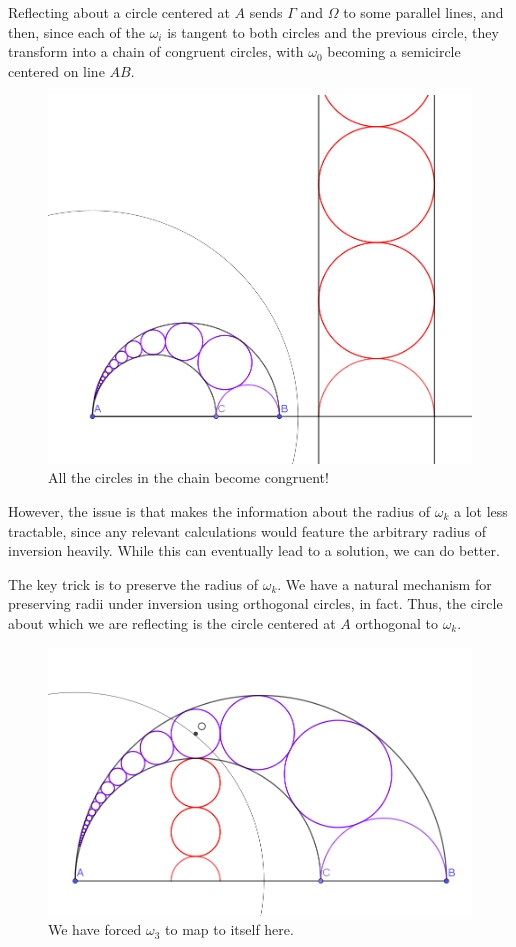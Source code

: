 \documentclass{scrartcl}
\begin{document}
Reflecting about a circle centered at $A$ sends
$\Gamma$ and $\Omega$ to some parallel lines,
and then, since each of the $\omega_i$ is tangent to
both circles and the previous circle, they transform into
a chain of congruent circles, with $\omega_0$ becoming a semicircle
centered on line $AB$.

\begin{figure}[h]
	\centering
	\includegraphics[width=0.7\linewidth]{shoemaker_inverted}
	\caption{All the circles in the chain become congruent!}
	\label{fig:shoemakerinverted}
\end{figure}

\pagebreak
However, the issue is that makes the information about
the radius of $\omega_k$ a lot less tractable, since any
relevant calculations would feature the arbitrary
radius of inversion heavily.
While this can eventually lead to a solution, we can do better.

The key trick is to preserve the radius of $\omega_k$.
We have a natural mechanism for preserving radii under inversion
using orthogonal circles, in fact.
Thus, the circle about which we are reflecting is
the circle centered at $A$ orthogonal to $\omega_k$.

\begin{figure}[h]
	\centering
	\includegraphics[width=0.7\linewidth]{shoemaker_overlaid}
	\caption{We have forced $\omega_3$ to map to itself here.}
	\label{fig:shoemakeroverlaid}
\end{figure}
\end{document}
